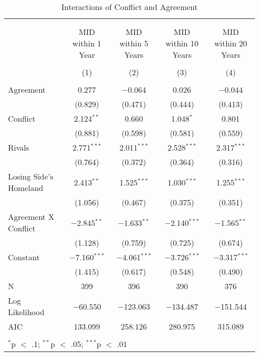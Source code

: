 \documentclass{article}
\begin{document}
\begin{table}[!htbp] \centering 
  \caption{Interactions of Conflict and Agreement} 
  \label{} 
\begin{tabular}{@{\extracolsep{5pt}}lcccc} 
\\[-1.8ex]\hline \\[-1.8ex] 
\\[-1.8ex] & MID within 1 Year & MID within 5 Years & MID within 10 Years & MID within 20 Years \\ 
\\[-1.8ex] & (1) & (2) & (3) & (4)\\ 
\hline \\[-1.8ex] 
 Agreement & 0.277 & $-$0.064 & 0.026 & $-$0.044 \\ 
  & (0.829) & (0.471) & (0.444) & (0.413) \\ 
  Conflict & 2.124$^{**}$ & 0.660 & 1.048$^{*}$ & 0.801 \\ 
  & (0.881) & (0.598) & (0.581) & (0.559) \\ 
  Rivals & 2.771$^{***}$ & 2.011$^{***}$ & 2.528$^{***}$ & 2.317$^{***}$ \\ 
  & (0.764) & (0.372) & (0.364) & (0.316) \\ 
  Losing Side's Homeland & 2.413$^{**}$ & 1.525$^{***}$ & 1.030$^{***}$ & 1.255$^{***}$ \\ 
  & (1.056) & (0.467) & (0.375) & (0.351) \\ 
  Agreement X Conflict & $-$2.845$^{**}$ & $-$1.633$^{**}$ & $-$2.140$^{***}$ & $-$1.565$^{**}$ \\ 
  & (1.128) & (0.759) & (0.725) & (0.674) \\ 
  Constant & $-$7.160$^{***}$ & $-$4.061$^{***}$ & $-$3.726$^{***}$ & $-$3.317$^{***}$ \\ 
  & (1.415) & (0.617) & (0.548) & (0.490) \\ 
 N & 399 & 396 & 390 & 376 \\ 
Log Likelihood & $-$60.550 & $-$123.063 & $-$134.487 & $-$151.544 \\ 
AIC & 133.099 & 258.126 & 280.975 & 315.089 \\ 
\hline \\[-1.8ex] 
\multicolumn{5}{l}{$^{*}$p $<$ .1; $^{**}$p $<$ .05; $^{***}$p $<$ .01} \\ 
\end{tabular} 
\end{table} 
\end{document}

